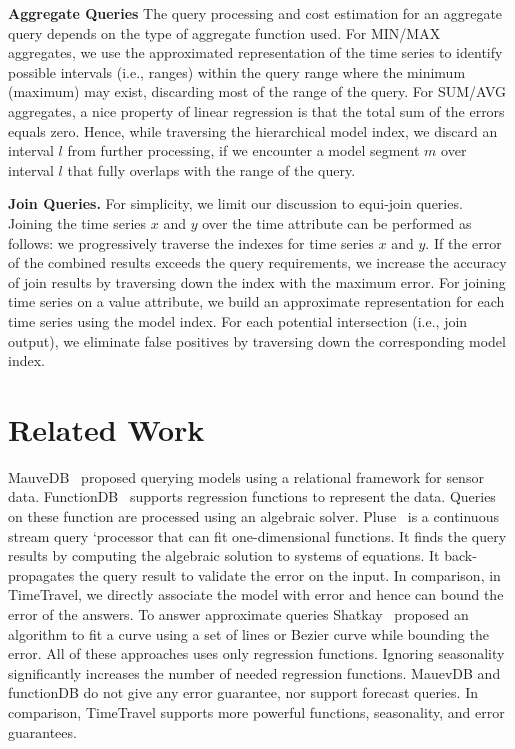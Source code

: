 \documentclass[10pt,conference,letterpaper]{IEEEtran}
\begin{document}
{\bf Aggregate Queries}
The query processing and cost estimation for an aggregate query depends on the type of aggregate function used.
For MIN/MAX aggregates, we use the approximated representation of the time series to  identify  possible intervals (i.e., ranges) within the query range where the  minimum (maximum) may exist, 
discarding most of the range of the query.
For SUM/AVG aggregates,  a nice property of linear regression is that the total sum of the errors equals zero. Hence, while traversing the hierarchical model index, we discard an interval $l$ from further processing, if we encounter a model segment $m$ over interval $l$ that fully overlaps with the range of the query.

{\bf Join Queries.}
For simplicity, we limit our discussion to equi-join queries. 
Joining the time series $x$ and $y$ over the time attribute can be performed as follows: we progressively traverse the indexes for time series $x$ and  $y$. If the error of the combined results exceeds the query requirements, we increase the accuracy of join results by traversing down the index  with the maximum error.
 For joining time series on a value attribute, we build an approximate representation for each time series using the model index.  
For each potential intersection (i.e., join output), we eliminate false positives by traversing down the corresponding model index.

\section{Related Work}
\label{sec:related}

MauveDB~\cite{MauveDB} proposed  querying models using a relational framework for sensor data.  FunctionDB~\cite{functionDB} supports regression functions to represent the data. Queries on these function are processed using an algebraic solver.
Pluse~\cite{pluse} is a continuous stream query `processor that can fit one-dimensional functions. It finds the query results by computing the algebraic solution to systems of equations. It back-propagates the query result to validate the error on the input. In comparison, in TimeTravel, we directly associate the model with error and hence can bound the error of the answers. 
 To answer approximate queries Shatkay~\cite{Shatkay} proposed  an algorithm to fit a curve using a set of lines or Bezier curve while bounding the error.
All of these approaches uses only regression functions. Ignoring  seasonality significantly increases the number of needed regression functions. MauevDB and functionDB do not give any error guarantee, nor support forecast queries. In comparison, TimeTravel supports more powerful functions, seasonality, and error guarantees. 
\end{document}
